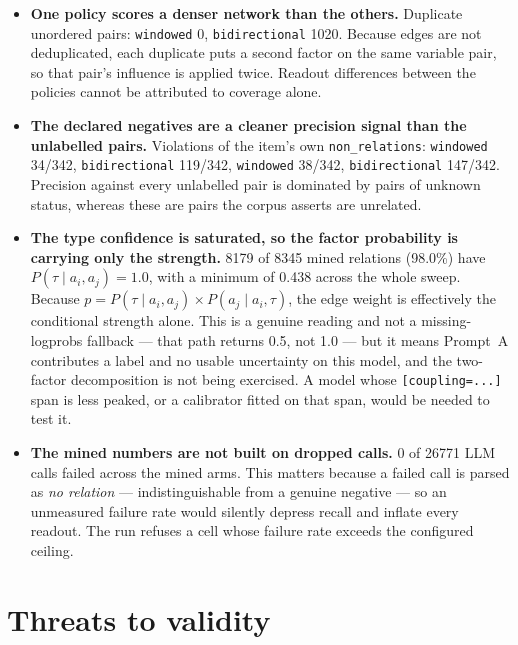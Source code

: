 \documentclass[11pt]{article}
\begin{document}
\begin{itemize}
\item \textbf{One policy scores a denser network than the others.} Duplicate unordered pairs: \texttt{windowed} 0, \texttt{bidirectional} 1020. Because edges are not deduplicated, each duplicate puts a second factor on the same variable pair, so that pair's influence is applied twice. Readout differences between the policies cannot be attributed to coverage alone.
\item \textbf{The declared negatives are a cleaner precision signal than the unlabelled pairs.} Violations of the item's own \texttt{non\_relations}: \texttt{windowed} 34/342, \texttt{bidirectional} 119/342, \texttt{windowed} 38/342, \texttt{bidirectional} 147/342. Precision against every unlabelled pair is dominated by pairs of unknown status, whereas these are pairs the corpus asserts are unrelated.
\item \textbf{The type confidence is saturated, so the factor probability is carrying only the strength.} 8179 of 8345 mined relations (98.0\%) have $P(\tau \mid a_i,a_j) = 1.0$, with a minimum of 0.438 across the whole sweep. Because $p = P(\tau \mid a_i,a_j) \times P(a_j \mid a_i,\tau)$, the edge weight is effectively the conditional strength alone. This is a genuine reading and not a missing-logprobs fallback --- that path returns 0.5, not 1.0 --- but it means Prompt~A contributes a label and no usable uncertainty on this model, and the two-factor decomposition is not being exercised. A model whose \texttt{[coupling=...]} span is less peaked, or a calibrator fitted on that span, would be needed to test it.
\item \textbf{The mined numbers are not built on dropped calls.} 0 of 26771 LLM calls failed across the mined arms. This matters because a failed call is parsed as \emph{no relation} --- indistinguishable from a genuine negative --- so an unmeasured failure rate would silently depress recall and inflate every readout. The run refuses a cell whose failure rate exceeds the configured ceiling.
\end{itemize}

\section{Threats to validity}
\end{document}

